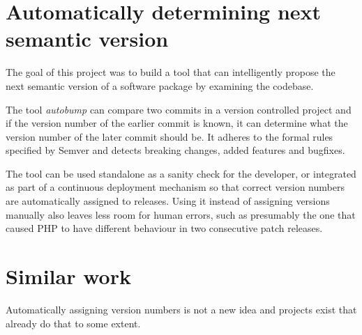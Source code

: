 \documentclass{l4proj}
\begin{document}
\section{Automatically determining next semantic version}
The goal of this project was to build a tool that can intelligently propose
the next semantic version of a software package by examining the codebase.

The tool \textit{autobump} can compare two commits in a version controlled
project and if the version number of the earlier commit is known, it can determine
what the version number of the later commit should be. It adheres to the formal
rules specified by Semver\cite{SemanticVersioning} and detects breaking changes,
added features and bugfixes.


The tool can be used standalone as a sanity check for the developer, or integrated
as part of a continuous deployment mechanism so that correct version numbers are
automatically assigned to releases. Using it instead of assigning versions manually
also leaves less room for human errors, such as presumably the one that caused PHP
to have different behaviour in two consecutive patch releases.


\section{Similar work}
Automatically assigning version numbers is not a new idea and projects
exist that already do that to some extent.




\end{document}
